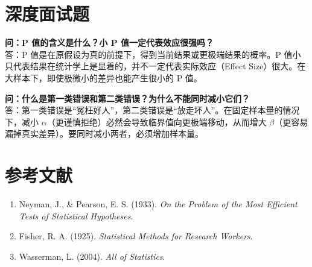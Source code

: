 \documentclass[12pt, a4paper]{article}
\begin{document}
\section{深度面试题}

\textbf{问：P 值的含义是什么？小 P 值一定代表效应很强吗？}\\
答：P 值是在原假设为真的前提下，得到当前结果或更极端结果的概率。P 值小只代表结果在统计学上是显着的，并不一定代表实际效应（Effect Size）很大。在大样本下，即使极微小的差异也能产生很小的 P 值。

\textbf{问：什么是第一类错误和第二类错误？为什么不能同时减小它们？}\\
答：第一类错误是“冤枉好人”，第二类错误是“放走坏人”。在固定样本量的情况下，减小 $\alpha$（更谨慎拒绝）必然会导致临界值向更极端移动，从而增大 $\beta$（更容易漏掉真实差异）。要同时减小两者，必须增加样本量。

\section{参考文献}
\begin{enumerate}
    \item Neyman, J., \& Pearson, E. S. (1933). \textit{On the Problem of the Most Efficient Tests of Statistical Hypotheses}.
    \item Fisher, R. A. (1925). \textit{Statistical Methods for Research Workers}.
    \item Wasserman, L. (2004). \textit{All of Statistics}.
\end{enumerate}
\end{document}
